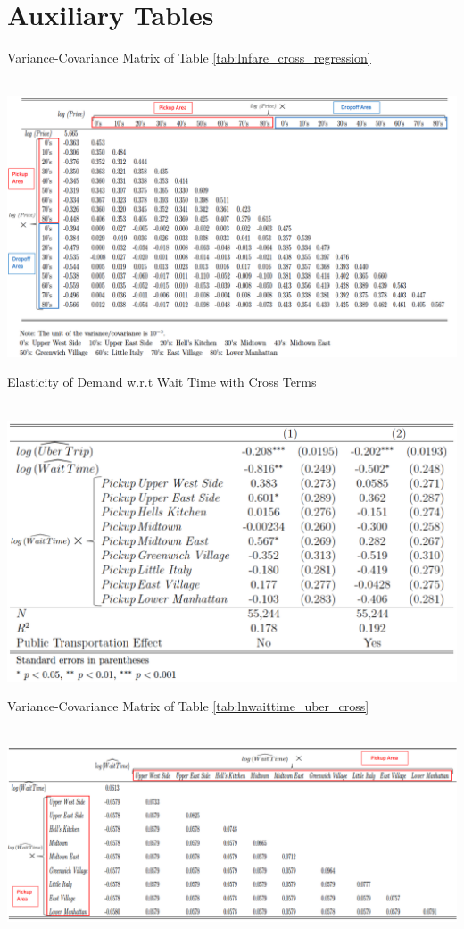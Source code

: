 \section{Auxiliary Tables}


\begin{table}[h]
\centering
\caption{Variance-Covariance Matrix of Table \ref{tab:lnfare_cross_regression}}\label{tab:vce_lnfare}\\
\vspace{0.2cm}
\includegraphics[width=22cm,angle=90]{Tables/vce_lnfare.png}
\end{table}



\begin{table}[h]
\centering
\caption{Elasticity of Demand w.r.t Wait Time with Cross Terms}\label{tab:lnwaittime_uber_cross}\\
\vspace{0.2cm}
\includegraphics[width=16cm]{Tables/lnwaittime_uber_cross.png}
\end{table}

\begin{table}[h]
\centering
\caption{Variance-Covariance Matrix of Table \ref{tab:lnwaittime_uber_cross}}\label{tab:vce_lnuber}\\
\vspace{0.5cm}
\includegraphics[width=22cm,angle=90]{Tables/vce_lnuber.png}
\end{table}